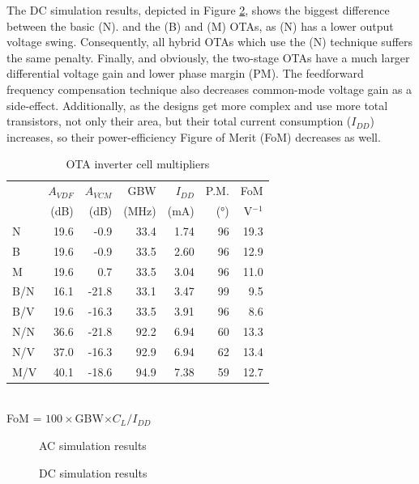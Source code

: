 \documentclass[conference]{IEEEtran}
\begin{document}
	The DC simulation results, depicted in Figure \ref{fig:sim:dc}, shows the biggest difference between the basic (N). and the (B) and (M) OTAs, as (N) has a lower output voltage swing. Consequently, all hybrid OTAs which use the (N) technique suffers the same penalty. Finally, and obviously, the two-stage OTAs have a much larger differential voltage gain and lower phase margin (PM). The feedforward frequency compensation technique also decreases common-mode voltage gain as a side-effect. Additionally, as the designs get more complex and use more total transistors, not only their area, but their total current consumption ($I_{DD}$) increases, so their power-efficiency Figure of Merit (FoM) decreases as well.
	
	\begin{table}[htbp]
		\caption{OTA inverter cell multipliers}\label{table:ota:summary}
		\centering
		\begin{tabular}{l|r r r r r r }
			& $A_{VDF}$ & $A_{VCM}$ & GBW   & $I_{DD}$ & P.M. & FoM      \\
			& (dB)      & (dB)      & (MHz) & (mA)     & (°)  & V$^{-1}$ \\
			\hline
			N   & 19.6 &  -0.9 &  33.4 & 1.74 & 96 & 19.3 \\
			B   & 19.6 &  -0.9 &  33.5 & 2.60 & 96 & 12.9 \\
			M   & 19.6 &   0.7 &  33.5 & 3.04 & 96 & 11.0 \\
			B/N & 16.1 & -21.8 &  33.1 & 3.47 & 99 &  9.5 \\
			B/V & 19.6 & -16.3 &  33.5 & 3.91 & 96 &  8.6 \\
			N/N & 36.6 & -21.8 &  92.2 & 6.94 & 60 & 13.3 \\
			N/V & 37.0 & -16.3 &  92.9 & 6.94 & 62 & 13.4 \\
			M/V & 40.1 & -18.6 &  94.9 & 7.38 & 59 & 12.7 \\
		\end{tabular}
		\footnotesize{\\FoM = $100\times$GBW$\times C_L / I_{DD}$}
	\end{table}
	
	\begin{figure}[!htbp]
		
		\caption{AC simulation results}
		\label{fig:sim:ac}
	\end{figure}
	
	\begin{figure}[!htbp]
		
		\caption{DC simulation results}
		\label{fig:sim:dc}
	\end{figure}
	
\end{document}
